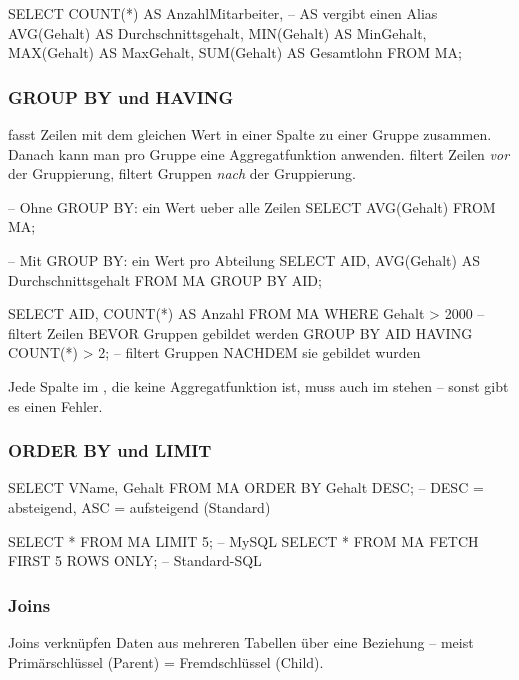 \begin{syntaxbox}[SQL]
SELECT
    COUNT(*)    AS AnzahlMitarbeiter,  -- AS vergibt einen Alias
    AVG(Gehalt) AS Durchschnittsgehalt,
    MIN(Gehalt) AS MinGehalt,
    MAX(Gehalt) AS MaxGehalt,
    SUM(Gehalt) AS Gesamtlohn
FROM MA;
\end{syntaxbox}

\subsubsection{GROUP BY und HAVING}
 fasst Zeilen mit dem gleichen Wert in einer Spalte zu einer Gruppe zusammen. Danach kann man pro Gruppe eine Aggregatfunktion anwenden.  filtert Zeilen \emph{vor} der Gruppierung,  filtert Gruppen \emph{nach} der Gruppierung.

\begin{syntaxbox}[SQL]
-- Ohne GROUP BY: ein Wert ueber alle Zeilen
SELECT AVG(Gehalt) FROM MA;

-- Mit GROUP BY: ein Wert pro Abteilung
SELECT AID, AVG(Gehalt) AS Durchschnittsgehalt
FROM MA
GROUP BY AID;

SELECT AID, COUNT(*) AS Anzahl
FROM MA
WHERE Gehalt > 2000       -- filtert Zeilen BEVOR Gruppen gebildet werden
GROUP BY AID
HAVING COUNT(*) > 2;      -- filtert Gruppen NACHDEM sie gebildet wurden
\end{syntaxbox}

\begin{merksatz}
Jede Spalte im , die keine Aggregatfunktion ist, muss auch im  stehen -- sonst gibt es einen Fehler.
\end{merksatz}

\subsubsection{ORDER BY und LIMIT}
\begin{syntaxbox}[SQL]
SELECT VName, Gehalt FROM MA
ORDER BY Gehalt DESC;   -- DESC = absteigend, ASC = aufsteigend (Standard)

SELECT * FROM MA LIMIT 5;                  -- MySQL
SELECT * FROM MA FETCH FIRST 5 ROWS ONLY;  -- Standard-SQL
\end{syntaxbox}

\subsubsection{Joins}
Joins verknüpfen Daten aus mehreren Tabellen über eine Beziehung -- meist Primärschlüssel (Parent) = Fremdschlüssel (Child).

